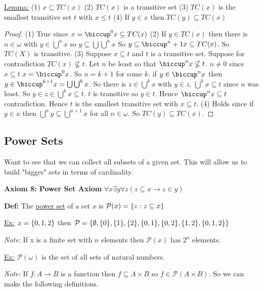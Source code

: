 \documentclass{article}
\begin{document}
    \underline{Lemma:}
    (1) $x \subseteq TC(x)$
    (2) $TC(x)$ is a transitive set
    (3) $TC(x)$ is the smallest transitive set $t$ with $x \leq t$
    (4) If $y \in x$ then $TC(y) \subseteq TC(x)$

    \begin{proof}
    (1) True since $x = \biccup^0 x \subseteq TC(x)$
    (2) If $y \in TC(x)$ then there is $n \in \omega$ with $y \in \bigcup^n x$ so $y \subseteq \bigcup \bigcup^n x$
        So $y \subseteq \biccup ^n+1 x \subseteq TC(x)$.
        So $TC(X)$ is transitive.
    (3) Suppose $x \subseteq t$ and $t$ is a transitive set.
        Suppose for contradiction $TC(x) \nsubseteq t$.
        Let $n$ be least so that $\biccup^n x \nsubseteq t$.
        $n \neq 0$ since $x \subseteq t$ $x=\biccup^0 x$.
        So $n=k+1$ for some $k$.
        if $y \in \biccup^n x$ then $y \in \biccup^{k+1} x = \bigcup \bigcup^k x$.
        So there is $z \in \bigcup^k x$ with $y \in z$.
        $\bigcup^k x \subseteq t$ since $n$ was least.
        So $y \in z \in \bigcup^k x \subseteq t$.
        $t$ is transitive so $y \in t$.
        Hence $\biccup^n x \subseteq t$ contradiction.
        Hence $t$ is the smallest transitive set with $x \subseteq t$.
    (4) Holds since if $y \in x$ then $\bigcup^n y \subseteq \bigcup^{n+1} x$ for all $n \in \omega$.
        So $TC(y) \subseteq TC(x)$.
    \end{proof}


    \subsection{Power Sets}
    Want to see that we can collect all subsets of a given set.
    This will allow us to build "bigger" sets in terms of cardinality.

    \textbf{Axiom 8: Power Set Axiom}
    $\forall x \exists y \forall z (z \subseteq x \rightarrow z \in y)$

    \textbf{Def:} The \underline{power set} of a set $x$ is $\mathcal{P}(x) = \{z : z \subseteq x\}$

    \underline{Ex:} $x = \{0,1,2\}$ then $\mathcal{P} = \{\emptyset, \{0\}, \{1\}, \{2\}, \{0,1\}, \{0,2\}, \{1,2\}, \{0,1,2\}\}$

    \emph{Note:} If x is a finite set with $n$ elements then $\mathcal{P}(x)$ has $2^n$ elements.

    \underline{Ex:} $\mathcal{P}(\omega)$ is the set of all sets of natural numbers.

    \emph{Note:} If $f : A \rightarrow B$ is a function then $f \subseteq A \times B$ so $f \in \mathcal{P}(A \times B)$.
    So we can make the following definitions.
\end{document}
